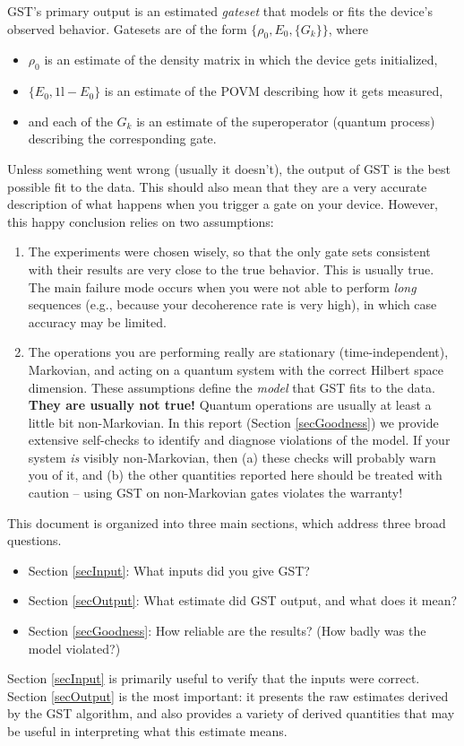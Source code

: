 \documentclass{article}[11pt]
\def\Id{1\!\mathrm{l}}
\begin{document}
GST's primary output is an estimated \emph{gateset} that models or fits the device's observed behavior.  Gatesets are of the form $\{\rho_0,E_0,\{G_k\}\}$, where
\begin{itemize}
\item $\rho_0$ is an estimate of the density matrix in which the device gets initialized,
\item $\{E_0,\Id-E_0\}$ is an estimate of the POVM describing how it gets measured,
\item and each of the $G_k$ is an estimate of the superoperator (quantum process) describing the corresponding gate.
\end{itemize}
Unless something went wrong (usually it doesn't), the output of GST is the best possible fit to the data.  This should also mean that they are a very accurate description of what happens when you trigger a gate on your device.  However, this happy conclusion relies on two assumptions:
\begin{enumerate}
\item The experiments were chosen wisely, so that the only gate sets consistent with their results are very close to the true behavior.  This is usually true.  The main failure mode occurs when you were not able to perform \emph{long} sequences (e.g., because your decoherence rate is very high), in which case accuracy may be limited. 
\item The operations you are performing really are stationary (time-independent), Markovian, and acting on a quantum system with the correct Hilbert space dimension.  These assumptions define the \emph{model} that GST fits to the data.  \textbf{They are usually not true!}  Quantum operations are usually at least a little bit non-Markovian.  In this report (Section \ref{secGoodness}) we provide extensive self-checks to identify and diagnose violations of the model.  If your system \emph{is} visibly non-Markovian, then (a) these checks will probably warn you of it, and (b) the other quantities reported here should be treated with caution -- using GST on non-Markovian gates violates the warranty!
\end{enumerate}

This document is organized into three main sections, which address three broad questions.
\begin{itemize}
\item Section \ref{secInput}:  What inputs did you give GST?
\item Section \ref{secOutput}:  What estimate did GST output, and what does it mean?
\item Section \ref{secGoodness}:  How reliable are the results? (How badly was the model violated?)
\end{itemize}
Section \ref{secInput} is primarily useful to verify that the inputs were correct.  Section \ref{secOutput} is the most important:  it presents the raw estimates derived by the GST algorithm, and also provides a variety of derived quantities that may be useful in interpreting what this estimate means.
\end{document}
